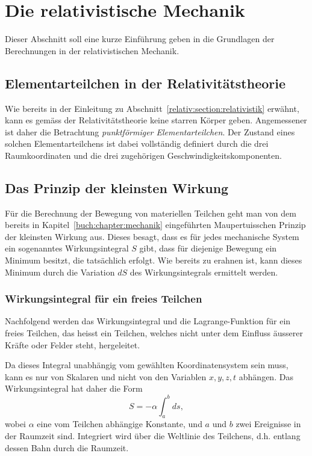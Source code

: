 
\section{Die relativistische Mechanik
\label{relativ:section:rel-mech}}

Dieser Abschnitt soll eine kurze Einführung geben in die
Grundlagen der Berechnungen in der relativistischen Mechanik.


\subsection{Elementarteilchen in der Relativitätstheorie
\label{relativ:section:elementarteilchen}}

Wie bereits in der Einleitung zu Abschnitt~\ref{relativ:section:relativistik} erwähnt,
kann es gemäss der Relativitätstheorie keine starren Körper geben.
Angemessener ist daher die Betrachtung \emph{punktförmiger Elementarteilchen}.
Der Zustand eines solchen Elementarteilchens ist dabei vollständig definiert durch
die drei Raumkoordinaten und die drei zugehörigen Geschwindigkeitskomponenten.


\subsection{Das Prinzip der kleinsten Wirkung
\label{relativ:section:kleinste-wirkung}}

Für die Berechnung der Bewegung von materiellen Teilchen geht man
von dem bereits in Kapitel~\ref{buch:chapter:mechanik} eingeführten
Maupertuisschen Prinzip der kleinsten Wirkung aus.
Dieses besagt, dass es für jedes mechanische System ein sogenanntes
Wirkungsintegral \(S\) gibt,
dass für diejenige Bewegung ein Minimum besitzt, die tatsächlich erfolgt.
Wie bereits zu erahnen ist, kann dieses Minimum durch die Variation \(dS\)
des Wirkungsintegrals ermittelt werden.

\subsubsection{Wirkungsintegral für ein freies Teilchen
\label{relativ:section:wirk-int-freies-teilchen}}

Nachfolgend werden das Wirkungsintegral und die Lagrange-Funktion
für ein freies Teilchen, das heisst ein Teilchen, welches nicht
unter dem Einfluss äusserer Kräfte oder Felder steht, hergeleitet.

Da dieses Integral unabhängig vom gewählten Koordinatensystem sein muss,
kann es nur von Skalaren und nicht von den Variablen \(x, y, z, t\) abhängen.
Das Wirkungsintegral hat daher die Form
\begin{equation}
    S = - \alpha \int_{a}^{b} ds,
\label{relativ:eqn:wirk-int-grundform}
\end{equation}
wobei \(\alpha\) eine vom Teilchen abhängige Konstante,
und \(a\) und \(b\) zwei Ereignisse in der Raumzeit sind.
Integriert wird über die Weltlinie des Teilchens,
d.h. entlang dessen Bahn durch die Raumzeit.

